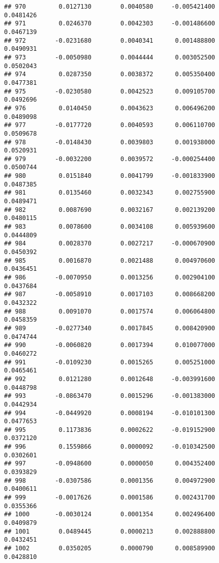 \documentclass[
]{article}
\begin{document}
\begin{verbatim}
## 970         0.0127130        0.0040580     -0.005421400             0.0481426
## 971         0.0246370        0.0042303     -0.001486600             0.0467139
## 972        -0.0231680        0.0040341      0.001488800             0.0490931
## 973        -0.0050980        0.0044444      0.003052500             0.0502043
## 974         0.0287350        0.0038372      0.005350400             0.0477381
## 975        -0.0230580        0.0042523      0.009105700             0.0492696
## 976         0.0140450        0.0043623      0.006496200             0.0489098
## 977        -0.0177720        0.0040593      0.006110700             0.0509678
## 978        -0.0148430        0.0039803      0.001938000             0.0520931
## 979        -0.0032200        0.0039572     -0.000254400             0.0500744
## 980         0.0151840        0.0041799     -0.001833900             0.0487385
## 981         0.0135460        0.0032343      0.002755900             0.0489471
## 982         0.0087690        0.0032167      0.002139200             0.0480115
## 983         0.0078600        0.0034108      0.005939600             0.0444809
## 984         0.0028370        0.0027217     -0.000670900             0.0450392
## 985         0.0016870        0.0021488      0.004970600             0.0436451
## 986        -0.0070950        0.0013256      0.002904100             0.0437684
## 987        -0.0058910        0.0017103      0.008668200             0.0432322
## 988         0.0091070        0.0017574      0.006064800             0.0458359
## 989        -0.0277340        0.0017845      0.008420900             0.0474744
## 990        -0.0060820        0.0017394      0.010077000             0.0460272
## 991        -0.0109230        0.0015265      0.005251000             0.0465461
## 992         0.0121280        0.0012648     -0.003991600             0.0448798
## 993        -0.0863470        0.0015296     -0.001383000             0.0442934
## 994        -0.0449920        0.0008194     -0.010101300             0.0477653
## 995         0.1173836        0.0002622     -0.019152900             0.0372120
## 996         0.1559866        0.0000092     -0.010342500             0.0302601
## 997        -0.0948600        0.0000050      0.004352400             0.0393829
## 998        -0.0307586        0.0001356      0.004972900             0.0400611
## 999        -0.0017626        0.0001586      0.002431700             0.0355366
## 1000       -0.0030124        0.0001354      0.002496400             0.0409879
## 1001        0.0489445        0.0000213      0.002888800             0.0432451
## 1002        0.0350205        0.0000790      0.008589900             0.0428810

\end{verbatim}
\end{document}
